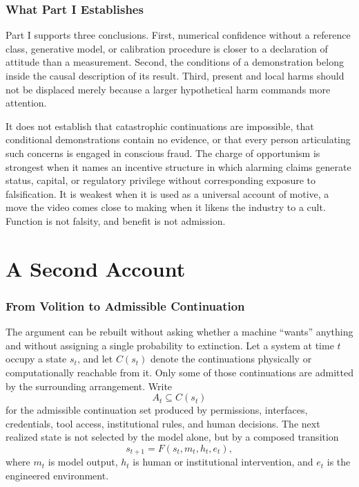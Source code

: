 \documentclass[11pt]{article}
\theoremstyle{definition}
\begin{document}
\section{What Part I Establishes}

Part I supports three conclusions. First, numerical confidence without a reference class, generative model, or calibration procedure is closer to a declaration of attitude than a measurement. Second, the conditions of a demonstration belong inside the causal description of its result. Third, present and local harms should not be displaced merely because a larger hypothetical harm commands more attention.

It does not establish that catastrophic continuations are impossible, that conditional demonstrations contain no evidence, or that every person articulating such concerns is engaged in conscious fraud. The charge of opportunism is strongest when it names an incentive structure in which alarming claims generate status, capital, or regulatory privilege without corresponding exposure to falsification. It is weakest when it is used as a universal account of motive, a move the video comes close to making when it likens the industry to a cult. Function is not falsity, and benefit is not admission.

\part{A Second Account}

\section{From Volition to Admissible Continuation}

The argument can be rebuilt without asking whether a machine ``wants'' anything and without assigning a single probability to extinction. Let a system at time $t$ occupy a state $s_t$, and let $C(s_t)$ denote the continuations physically or computationally reachable from it. Only some of those continuations are admitted by the surrounding arrangement. Write
\[
    A_t \subseteq C(s_t)
\]
for the admissible continuation set produced by permissions, interfaces, credentials, tool access, institutional rules, and human decisions. The next realized state is not selected by the model alone, but by a composed transition
\[
    s_{t+1}=F(s_t,m_t,h_t,e_t),
\]
where $m_t$ is model output, $h_t$ is human or institutional intervention, and $e_t$ is the engineered environment.
\end{document}
